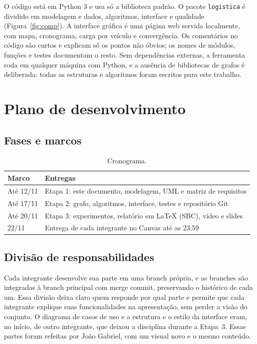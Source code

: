 \documentclass[12pt]{article}
\begin{document}
O código está em Python 3 e usa só a biblioteca padrão. O pacote \texttt{logistica} é dividido em modelagem e dados, algoritmos, interface e qualidade (Figura~\ref{fig:comp}). A interface gráfica é uma página web servida localmente, com mapa, cronograma, carga por veículo e convergência. Os comentários no código são curtos e explicam só os pontos não óbvios; os nomes de módulos, funções e testes documentam o resto. Sem dependências externas, a ferramenta roda em qualquer máquina com Python, e a ausência de bibliotecas de grafos é deliberada: todas as estruturas e algoritmos foram escritos para este trabalho.

\section{Plano de desenvolvimento}

\subsection{Fases e marcos}

\begin{table}[!ht]
\centering
\small
\begin{tabular}{L{2.2cm}L{8.4cm}}
\toprule
Marco & Entregas \\
\midrule
Até 12/11 & Etapa 1: este documento, modelagem, UML e matriz de requisitos \\
Até 17/11 & Etapa 2: grafo, algoritmos, interface, testes e repositório Git \\
Até 20/11 & Etapa 3: experimentos, relatório em LaTeX (SBC), vídeo e slides \\
22/11 & Entrega de cada integrante no Canvas até as 23:59 \\
\bottomrule
\end{tabular}
\caption{Cronograma.}
\end{table}

\subsection{Divisão de responsabilidades}

Cada integrante desenvolve sua parte em uma branch própria, e as branches são integradas à branch principal com merge commit, preservando o histórico de cada um. Essa divisão deixa claro quem responde por qual parte e permite que cada integrante explique suas funcionalidades na apresentação, sem perder a visão do conjunto. O diagrama de casos de uso e a estrutura e o estilo da interface eram, no início, de outro integrante, que deixou a disciplina durante a Etapa~3. Essas partes foram refeitas por João Gabriel, com um visual novo e o mesmo conteúdo.
\end{document}
